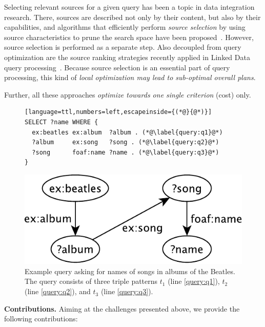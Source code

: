 Selecting relevant sources for a given query has been a topic in
data integration research. There, sources are described
not only by their content, but also by their capabilities, and
algorithms that efficiently perform \emph{source selection} by using
source characteristics to prune the search space have been
proposed~\cite{levy_querying_1996}. However, source selection is
performed as a separate step. Also decoupled from query optimization
are the source ranking strategies recently applied in Linked Data
query processing~\cite{harth_data_2010,ladwig_linked_2010}. Because
source selection is an essential part of query processing, this kind
of \emph{local optimization may lead to sub-optimal overall plans}.


Further, all these approaches \emph{optimize towards one single
  criterion} (cost) only.

\begin{figure}[ht]
  \centering
  \begin{minipage}{0.75\linewidth}
\begin{lstlisting}[language=ttl,numbers=left,escapeinside={(*@}{@*)}]
SELECT ?name WHERE {
  ex:beatles ex:album  ?album . (*@\label{query:q1}@*)
  ?album     ex:song   ?song . (*@\label{query:q2}@*)
  ?song      foaf:name ?name . (*@\label{query:q3}@*)
}
\end{lstlisting}
  \vspace{-0.3cm}
  \end{minipage}
  \vspace{-0.3cm}
  \includegraphics[width=0.7\linewidth]{figs/query-crop.pdf}
  \caption{Example query asking for names of songs in albums of the
    Beatles. The query consists of three triple patterns $t_1$ (line
    \ref{query:q1}), $t_2$ (line \ref{query:q2}), and $t_3$ (line
    \ref{query:q3}).}
  \label{fig:query}
\end{figure}

\textbf{Contributions.} Aiming at the challenges presented above, we
provide the following contributions:

